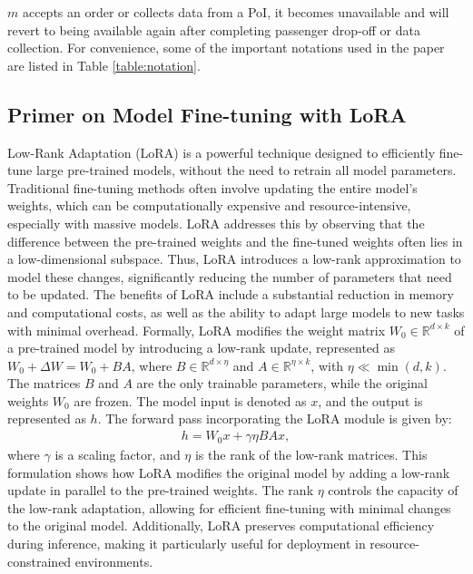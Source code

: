 $m$ accepts an order or collects data from a PoI, it becomes unavailable and will revert to being available again after completing passenger drop-off or data collection. For convenience, some of the important notations used in the paper are listed in Table \ref{table:notation}.

\subsection{Primer on Model Fine-tuning with LoRA}
\label{ssec:primer-lora}
Low-Rank Adaptation (LoRA) is a powerful technique designed to efficiently fine-tune large pre-trained models, without the need to retrain all model parameters. Traditional fine-tuning methods often involve updating the entire model’s weights, which can be computationally expensive and resource-intensive, especially with massive models. LoRA addresses this by observing that the difference between the pre-trained weights and the fine-tuned weights often lies in a low-dimensional subspace. Thus, LoRA introduces a low-rank approximation to model these changes, significantly reducing the number of parameters that need to be updated. The benefits of LoRA include a substantial reduction in memory and computational costs, as well as the ability to adapt large models to new tasks with minimal overhead.
Formally, LoRA modifies the weight matrix $W_0 \in \mathbb{R}^{d \times k}$ of a pre-trained model by introducing a low-rank update, represented as $W_0 + \Delta W = W_0 + BA$, where $B \in \mathbb{R}^{d \times \eta}$ and $A \in \mathbb{R}^{\eta \times k}$, with $\eta \ll \min(d, k)$. The matrices $B$ and $A$ are the only trainable parameters, while the original weights $W_0$ are frozen.  The model input is denoted as $x$, and the output is represented as $h$. The forward pass incorporating the LoRA module is given by:
\begin{align}
h = W_0 x + \gamma \eta BA x,
\end{align}
where \( \gamma \) is a scaling factor, and \( \eta \) is the rank of the low-rank matrices. This formulation shows how LoRA modifies the original model by adding a low-rank update in parallel to the pre-trained weights. The rank \( \eta \) controls the capacity of the low-rank adaptation, allowing for efficient fine-tuning with minimal changes to the original model. Additionally, LoRA preserves computational efficiency during inference, making it particularly useful for deployment in resource-constrained environments.


